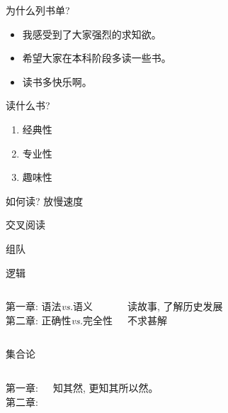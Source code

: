\begin{frame}{为什么列书单?}
  \begin{itemize}
    \item 我感受到了大家强烈的求知欲。
    \item 希望大家在本科阶段多读一些书。
    \item 读书多快乐啊。
  \end{itemize}
\end{frame}

\begin{frame}{读什么书?}
  \begin{enumerate}
    \centering
    \item 经典性
    \item 专业性
    \item 趣味性
  \end{enumerate}
\end{frame}

\begin{frame}{如何读?}
  放慢速度

  交叉阅读

  组队
\end{frame}

\begin{frame}{逻辑}
  \begin{columns}
      \begin{center}
	第一章: 语法\emph{vs.}语义 \\
	第二章: 正确性\emph{vs.}完全性
      \end{center}
      \begin{center}
	读故事, 了解历史发展 \\
	不求甚解
      \end{center}
  \end{columns}
\end{frame}

\begin{frame}{集合论}
  \begin{columns}
      \begin{center}
	第一章: \\
	第二章: 
      \end{center}
      \begin{center}
	知其然, 更知其所以然。
      \end{center}
  \end{columns}
\end{frame}

